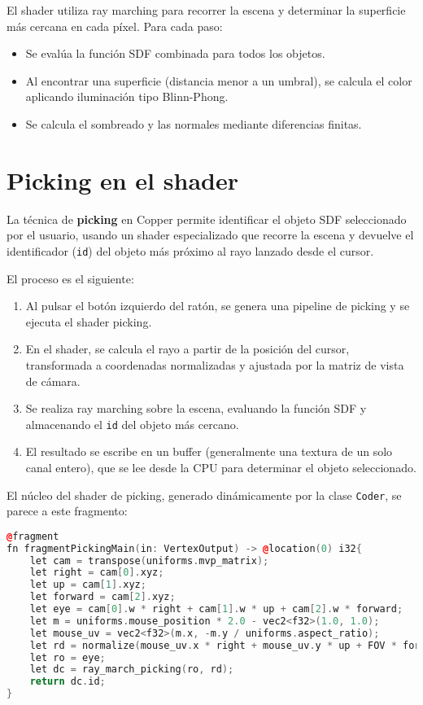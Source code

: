 El shader utiliza ray marching para recorrer la escena y determinar la
superficie más cercana en cada píxel. Para cada paso:

\begin{itemize}
    \item Se evalúa la función SDF combinada para todos los objetos.
    \item Al encontrar una superficie (distancia menor a un umbral), se calcula el color
          aplicando iluminación tipo Blinn-Phong.
    \item Se calcula el sombreado y las normales mediante diferencias finitas.
\end{itemize}

\section{Picking en el shader}

La técnica de \textbf{picking} en Copper permite identificar el objeto SDF
seleccionado por el usuario, usando un shader especializado que recorre la
escena y devuelve el identificador (\texttt{id}) del objeto más próximo al rayo
lanzado desde el cursor.

El proceso es el siguiente:

\begin{enumerate}
    \item Al pulsar el botón izquierdo del ratón, se genera una pipeline de picking y se
          ejecuta el shader picking.
    \item En el shader, se calcula el rayo a partir de la posición del cursor,
          transformada a coordenadas normalizadas y ajustada por la matriz de vista de
          cámara.
    \item Se realiza ray marching sobre la escena, evaluando la función SDF y almacenando
          el \texttt{id} del objeto más cercano.
    \item El resultado se escribe en un buffer (generalmente una textura de un solo canal
          entero), que se lee desde la CPU para determinar el objeto seleccionado.
\end{enumerate}

El núcleo del shader de picking, generado dinámicamente por la clase
\texttt{Coder}, se parece a este fragmento:

\begin{lstlisting}[language=C++, caption={Picking shader fragment}]
@fragment
fn fragmentPickingMain(in: VertexOutput) -> @location(0) i32{
    let cam = transpose(uniforms.mvp_matrix);
    let right = cam[0].xyz;
    let up = cam[1].xyz;
    let forward = cam[2].xyz;
    let eye = cam[0].w * right + cam[1].w * up + cam[2].w * forward;
    let m = uniforms.mouse_position * 2.0 - vec2<f32>(1.0, 1.0);
    let mouse_uv = vec2<f32>(m.x, -m.y / uniforms.aspect_ratio);
    let rd = normalize(mouse_uv.x * right + mouse_uv.y * up + FOV * forward);
    let ro = eye;
    let dc = ray_march_picking(ro, rd);
    return dc.id;
}
\end{lstlisting}

